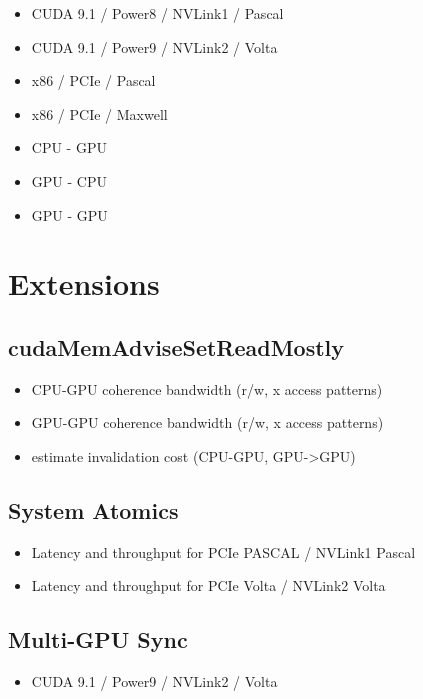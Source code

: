 \begin{itemize}
    \item CUDA 9.1 / Power8 / NVLink1 / Pascal
    \item CUDA 9.1 / Power9 / NVLink2 / Volta
    \item x86 / PCIe / Pascal
    \item x86 / PCIe / Maxwell
\end{itemize}

\begin{itemize}
    \item CPU - GPU
    \item GPU - CPU
    \item GPU - GPU
\end{itemize}


\section{Extensions}
\subsection{cudaMemAdviseSetReadMostly}
\begin{itemize}
    \item CPU-GPU coherence bandwidth (r/w, x access patterns)
    \item GPU-GPU coherence bandwidth (r/w, x access patterns)
    \item estimate invalidation cost (CPU-GPU, GPU->GPU)
\end{itemize}

\subsection{System Atomics}
\begin{itemize}
    \item Latency and throughput for PCIe PASCAL / NVLink1 Pascal 
    \item Latency and throughput for PCIe Volta / NVLink2 Volta
\end{itemize}

\subsection{Multi-GPU Sync}
\begin{itemize}
    \item CUDA 9.1 / Power9 / NVLink2 / Volta
\end{itemize}


